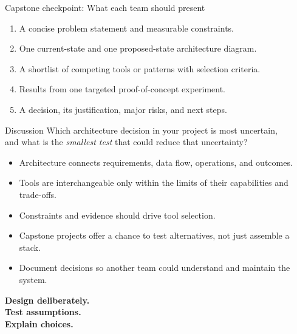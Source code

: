 \documentclass[aspectratio=43,10pt]{beamer}
\begin{document}
\begin{frame}{Capstone checkpoint: What each team should present}
\begin{enumerate}
  \item A concise problem statement and measurable constraints.
  \item One current-state and one proposed-state architecture diagram.
  \item A shortlist of competing tools or patterns with selection criteria.
  \item Results from one targeted proof-of-concept experiment.
  \item A decision, its justification, major risks, and next steps.
\end{enumerate}
\begin{block}{Discussion}
Which architecture decision in your project is most uncertain,\\and what is the \emph{smallest test} that could reduce that uncertainty?
\end{block}
\end{frame}

\begin{frame}{}
\begin{itemize}
  \item Architecture connects requirements, data flow, operations, and outcomes.
  \item Tools are interchangeable only within the limits of their capabilities and trade-offs.
  \item Constraints and evidence should drive tool selection.
  \item Capstone projects offer a chance to test alternatives, not just assemble a stack.
  \item Document decisions so another team could understand and maintain the system.
\end{itemize}
\vfill
\centering\Large \textbf{Design deliberately.\\Test assumptions.\\Explain choices.}
\end{frame}
\end{document}
